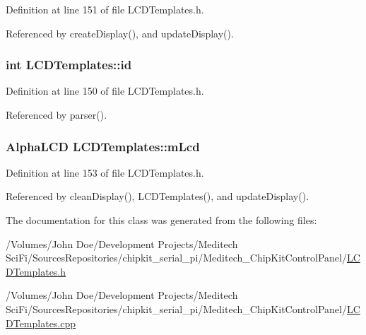 Definition at line 151 of file L\-C\-D\-Templates.\-h.



Referenced by create\-Display(), and update\-Display().

\hypertarget{class_l_c_d_templates_ad5102b181b458439b6714c9b2576f3b2}{
\subsubsection[{id}]{\setlength{\rightskip}{0pt plus 5cm}int L\-C\-D\-Templates\-::id}}\label{class_l_c_d_templates_ad5102b181b458439b6714c9b2576f3b2}


Definition at line 150 of file L\-C\-D\-Templates.\-h.



Referenced by parser().

\hypertarget{class_l_c_d_templates_a92a2475558ce15aa8a311c36705788fd}{
\subsubsection[{m\-Lcd}]{\setlength{\rightskip}{0pt plus 5cm}Alpha\-L\-C\-D L\-C\-D\-Templates\-::m\-Lcd\hspace{0.3cm}{\ttfamily [private]}}}\label{class_l_c_d_templates_a92a2475558ce15aa8a311c36705788fd}


Definition at line 153 of file L\-C\-D\-Templates.\-h.



Referenced by clean\-Display(), L\-C\-D\-Templates(), and update\-Display().



The documentation for this class was generated from the following files\-:\begin{DoxyCompactItemize}
\item 
/\-Volumes/\-John Doe/\-Development Projects/\-Meditech Sci\-Fi/\-Sources\-Repositories/chipkit\-\_\-serial\-\_\-pi/\-Meditech\-\_\-\-Chip\-Kit\-Control\-Panel/\hyperlink{_l_c_d_templates_8h}{L\-C\-D\-Templates.\-h}\item 
/\-Volumes/\-John Doe/\-Development Projects/\-Meditech Sci\-Fi/\-Sources\-Repositories/chipkit\-\_\-serial\-\_\-pi/\-Meditech\-\_\-\-Chip\-Kit\-Control\-Panel/\hyperlink{_l_c_d_templates_8cpp}{L\-C\-D\-Templates.\-cpp}\end{DoxyCompactItemize}
